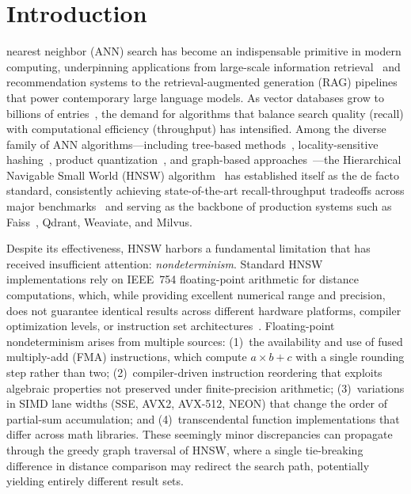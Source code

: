 \documentclass[10pt,journal,compsoc]{IEEEtran}
\newcommand{\hnsw}{\textsc{HNSW}}
\begin{document}
\maketitle

\section{Introduction}
 nearest neighbor (ANN) search has become an indispensable primitive in modern computing, underpinning applications from large-scale information retrieval~\cite{jegou2011pq} and recommendation systems to the retrieval-augmented generation (RAG) pipelines that power contemporary large language models. As vector databases grow to billions of entries~\cite{simhadri2022neurips}, the demand for algorithms that balance search quality (recall) with computational efficiency (throughput) has intensified. Among the diverse family of ANN algorithms---including tree-based methods~\cite{bentley1975kdtree}, locality-sensitive hashing~\cite{gionis1999lsh}, product quantization~\cite{jegou2011pq}, and graph-based approaches~\cite{malkov2014nsw}---the Hierarchical Navigable Small World (\hnsw{}) algorithm~\cite{malkov2020hnsw} has established itself as the de facto standard, consistently achieving state-of-the-art recall-throughput tradeoffs across major benchmarks~\cite{simhadri2022neurips} and serving as the backbone of production systems such as Faiss~\cite{douze2024faiss}, Qdrant, Weaviate, and Milvus.

Despite its effectiveness, \hnsw{} harbors a fundamental limitation that has received insufficient attention: \emph{nondeterminism}. Standard \hnsw{} implementations rely on IEEE~754 floating-point arithmetic for distance computations, which, while providing excellent numerical range and precision, does not guarantee identical results across different hardware platforms, compiler optimization levels, or instruction set architectures~\cite{goldberg1991float}. Floating-point nondeterminism arises from multiple sources: (1)~the availability and use of fused multiply-add (FMA) instructions, which compute $a \times b + c$ with a single rounding step rather than two; (2)~compiler-driven instruction reordering that exploits algebraic properties not preserved under finite-precision arithmetic; (3)~variations in SIMD lane widths (SSE, AVX2, AVX-512, NEON) that change the order of partial-sum accumulation; and (4)~transcendental function implementations that differ across math libraries. These seemingly minor discrepancies can propagate through the greedy graph traversal of \hnsw{}, where a single tie-breaking difference in distance comparison may redirect the search path, potentially yielding entirely different result sets.
\end{document}
